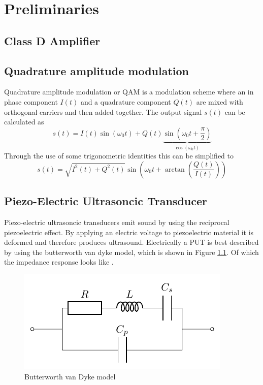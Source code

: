 \chapter{Preliminaries}
\section{Class D Amplifier}
\section{Quadrature amplitude modulation}\label{2_QAM_sec:QAM}
Quadrature amplitude modulation or QAM \cite{nat_skript} is a modulation scheme where an in phase component $I(t)$ and a quadrature component $Q(t)$ are mixed with orthogonal carriers and then added together. The output signal $s(t)$ can be calculated as 
\begin{equation}
    s(t) = I(t) \sin \left ( \omega_0 t\right ) + Q(t)\underbrace{\sin \left ( \omega_0 t + \frac{\pi}{2} \right)}_{\cos{(\omega_0 t)}}
\end{equation}
Through the use of some trigonometric identities this can be simplified to 
\begin{equation}
    s(t) = \sqrt{I^2(t) + Q^2(t)} \sin{\left(\omega_0 t + \arctan{ \left ( \frac{Q(t)}{I(t)} \right )} \right )}
\end{equation}
\section{Piezo-Electric Ultrasoncic Transducer}
Piezo-electric ultrasoncic transducers emit sound by using the reciprocal piezoelectric effect. By applying an electric voltage to piezoelectric material it is deformed and therefore produces ultrasound. Electrically a PUT is best described by using the butterworth van dyke model, which is shown in Figure \ref{2_fig:butt_dyke_model}.
Of which the impedance response looks like .
\begin{figure}
    \centering
    \includegraphics{sections/Van_Dyke_Circuit.pdf}
    \caption{Butterworth van Dyke model}
    \label{2_fig:butt_dyke_model}
\end{figure}
